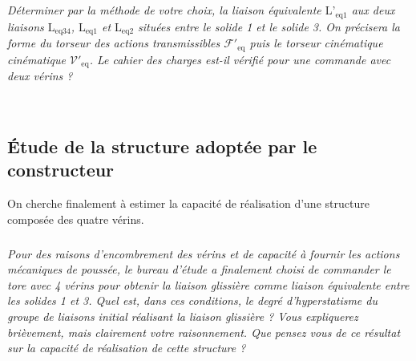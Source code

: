 \begin{multicols}{2}
\subparagraph{}\textit{Déterminer par la méthode de votre choix, la liaison équivalente $\text{L'}_{\text{eq}1}$ aux deux liaisons $\text{L}_{\text{eq}34}$, $\text{L}_{\text{eq}1}$ et $\text{L}_{\text{eq}2}$ situées
entre le solide 1 et le solide 3. On précisera la forme du torseur des actions transmissibles $\mathcal{F}'_{\text{eq}}$ puis le torseur cinématique cinématique $\mathcal{V}'_{\text{eq}}$. Le cahier des charges est-il vérifié pour une commande avec deux vérins ?}
\ifprof
\begin{corrige}~\\
\end{corrige}
\else
\fi

\subsection*{Étude de la structure adoptée par le constructeur}
\begin{obj}
On cherche finalement à estimer la capacité de réalisation d'une structure composée des quatre
vérins.
\end{obj}





\subparagraph{}\textit{Pour des raisons d'encombrement des vérins et de capacité à fournir les actions mécaniques de poussée, le
bureau d'étude a finalement choisi de commander le tore avec 4 vérins pour obtenir la liaison glissière
comme liaison équivalente entre les solides 1 et 3. Quel est, dans ces conditions, le degré d'hyperstatisme du
groupe de liaisons initial réalisant la liaison glissière ? Vous expliquerez brièvement, mais clairement votre
raisonnement. Que pensez vous de ce résultat sur la capacité de réalisation de cette structure ?}
\ifprof
\begin{corrige}~\\
\end{corrige}
\else
\fi

\ifprof
\else
\end{multicols}
\fi
%
